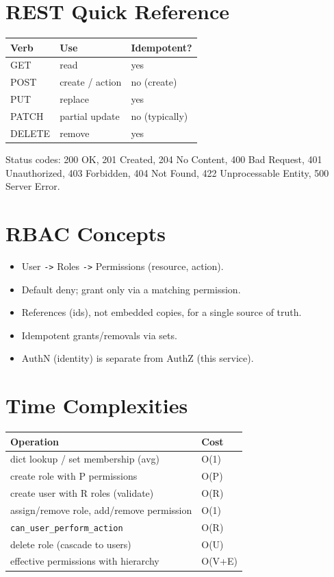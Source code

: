 \documentclass[11pt,a4paper]{report}
\begin{document}
\section{REST Quick Reference}
\begin{longtable}{p{} p{} p{}}
\textbf{Verb} & \textbf{Use} & \textbf{Idempotent?} \\
\hline
\endhead
GET & read & yes \\
POST & create / action & no (create) \\
PUT & replace & yes \\
PATCH & partial update & no (typically) \\
DELETE & remove & yes \\
\end{longtable}
Status codes: 200 OK, 201 Created, 204 No Content, 400 Bad Request, 401
Unauthorized, 403 Forbidden, 404 Not Found, 422 Unprocessable Entity, 500 Server
Error.

\section{RBAC Concepts}
\begin{itemize}[leftmargin=1.4em]
  \item User \texttt{->} Roles \texttt{->} Permissions (resource, action).
  \item Default deny; grant only via a matching permission.
  \item References (ids), not embedded copies, for a single source of truth.
  \item Idempotent grants/removals via sets.
  \item AuthN (identity) is separate from AuthZ (this service).
\end{itemize}

\section{Time Complexities}
\begin{longtable}{p{} p{}}
\textbf{Operation} & \textbf{Cost} \\
\hline
\endhead
dict lookup / set membership (avg) & O(1) \\
create role with P permissions & O(P) \\
create user with R roles (validate) & O(R) \\
assign/remove role, add/remove permission & O(1) \\
\texttt{can\_user\_perform\_action} & O(R) \\
delete role (cascade to users) & O(U) \\
effective permissions with hierarchy & O(V+E) \\
\end{longtable}
\end{document}
